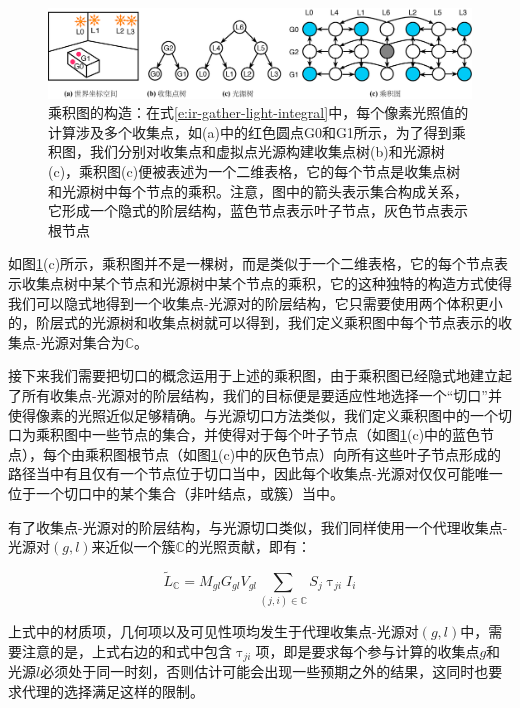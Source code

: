 \begin{figure}
\begin{fullwidth}
	\includegraphics[width=\thewidth]{figures/ir/product-graph}
	\caption{乘积图的构造：在式\ref{e:ir-gather-light-integral}中，每个像素光照值的计算涉及多个收集点，如(a)中的红色圆点G0和G1所示，为了得到乘积图，我们分别对收集点和虚拟点光源构建收集点树(b)和光源树(c)，乘积图(c)便被表述为一个二维表格，它的每个节点是收集点树和光源树中每个节点的乘积。注意，图中的箭头表示集合构成关系，它形成一个隐式的阶层结构，蓝色节点表示叶子节点，灰色节点表示根节点}
	\label{f:ir-product-graph}
\end{fullwidth}
\end{figure}

如图\ref{f:ir-product-graph}(c)所示，乘积图并不是一棵树，而是类似于一个二维表格，它的每个节点表示收集点树中某个节点和光源树中某个节点的乘积，它的这种独特的构造方式使得我们可以隐式地得到一个收集点-光源对的阶层结构，它只需要使用两个体积更小的，阶层式的光源树和收集点树就可以得到，我们定义乘积图中每个节点表示的收集点-光源对集合为$\mathds{C}$。

接下来我们需要把切口的概念运用于上述的乘积图，由于乘积图已经隐式地建立起了所有收集点-光源对的阶层结构，我们的目标便是要适应性地选择一个“切口”并使得像素的光照近似足够精确。与光源切口方法类似，我们定义乘积图中的一个切口为乘积图中一些节点的集合，并使得对于每个叶子节点（如图\ref{f:ir-product-graph}(c)中的蓝色节点），每个由乘积图根节点（如图\ref{f:ir-product-graph}(c)中的灰色节点）向所有这些叶子节点形成的路径当中有且仅有一个节点位于切口当中，因此每个收集点-光源对仅仅可能唯一位于一个切口中的某个集合（非叶结点，或簇）当中。

有了收集点-光源对的阶层结构，与光源切口类似，我们同样使用一个代理收集点-光源对$(g,l)$来近似一个簇$\mathds{C}$的光照贡献，即有：

\begin{equation}\label{e:ir-multi-sublinear}
	\tilde{L}_{\mathds{C}}=M_{gl}G_{gl}V_{gl}\sum_{(j,i)\in\mathds{C}}S_j\uptau_{ji}I_i
\end{equation}

\noindent 上式中的材质项，几何项以及可见性项均发生于代理收集点-光源对$(g,l)$中，需要注意的是，上式右边的和式中包含$\uptau_{ji}$项，即是要求每个参与计算的收集点$g$和光源$l$必须处于同一时刻，否则估计可能会出现一些预期之外的结果，这同时也要求代理的选择满足这样的限制。

